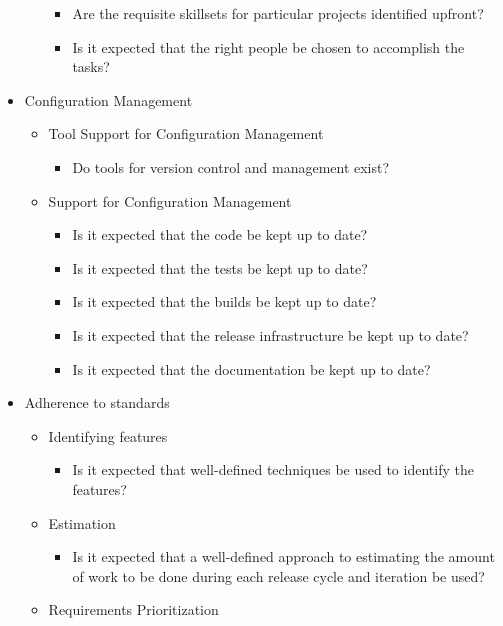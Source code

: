 \begin{appendices}
\begin{itemize}
\begin{itemize}
\begin{itemize}
					\item Are the requisite skillsets for particular projects identified upfront?
					\item Is it expected that the right people be chosen to accomplish the tasks?
				\end{itemize}
		\end{itemize}
	\item Configuration Management
		\begin{itemize}
			\item Tool Support for Configuration Management
				\begin{itemize}
					\item Do tools for version control and management exist?
				\end{itemize}
			\item Support for Configuration Management
				\begin{itemize}
					\item Is it expected that the code be kept up to date?
					\item Is it expected that the tests be kept up to date?
					\item Is it expected that the builds be kept up to date?
					\item Is it expected that the release infrastructure be kept up to date?
					\item Is it expected that the documentation be kept up to date?
				\end{itemize}
		\end{itemize}
	\item Adherence to standards
		\begin{itemize}
			\item Identifying features
				\begin{itemize}
					\item Is it expected that well-defined techniques be used to identify the features?
					\end{itemize}
			\item Estimation
				\begin{itemize}
					\item Is it expected that a well-defined approach to estimating the amount of work to be done during each release cycle and iteration be used?
				\end{itemize}
			\item Requirements Prioritization

\end{itemize}
\end{itemize}
\end{appendices}
